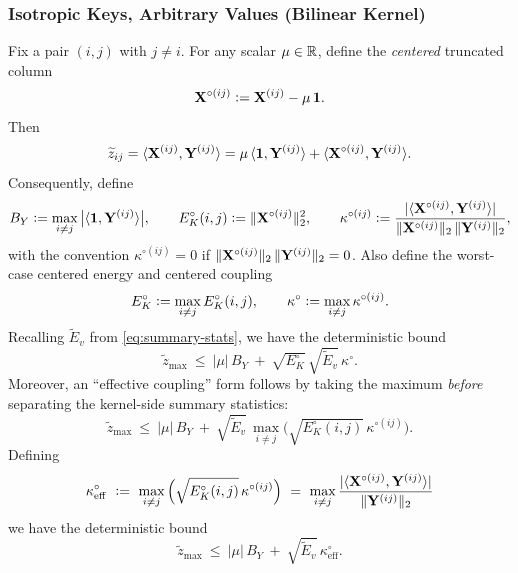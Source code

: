 \subsubsection{Isotropic Keys, Arbitrary Values (Bilinear Kernel)}
\begin{lemma}
\label{lem:mean-residual-app}
Fix a pair $(i,j)$ with $j\neq i$.
For any scalar $\mu\in\mathbb{R}$, define the \emph{centered} truncated column
\[
\mathbf{X}^{\circ(ij)} \vcentcolon= \mathbf{X}^{(ij)}-\mu\,{\mathbf{1}}.
\]
Then
\[
\widetilde{z}_{ij}=\langle {\mathbf{X}^{(ij)}}, {\mathbf{Y}^{(ij)}} \rangle
= \mu\,\langle {{\mathbf{1}}}, {\mathbf{Y}^{(ij)}} \rangle + \langle {\mathbf{X}^{\circ(ij)}}, {\mathbf{Y}^{(ij)}} \rangle.
\]
Consequently, define
\[
B_{Y} \vcentcolon= \max_{i\neq j}\big|\langle {{\mathbf{1}}}, {\mathbf{Y}^{(ij)}} \rangle\big|,
\qquad
E_{K}^\circ(i,j) \vcentcolon= \|\mathbf{X}^{\circ(ij)}\|_{2}^2,
\qquad
\kappa^{\circ(ij)} \vcentcolon= \frac{|\langle {\mathbf{X}^{\circ(ij)}}, {\mathbf{Y}^{(ij)}} \rangle|}{\|\mathbf{X}^{\circ(ij)}\|_{2}\,\|\mathbf{Y}^{(ij)}\|_2},
\]
with the convention $\kappa^{\circ(ij)}=0$ if $\|\mathbf{X}^{\circ(ij)}\|_{2}\,\|\mathbf{Y}^{(ij)}\|_{2}=0$.
Also define the worst-case centered energy and centered coupling
\[
E_{K}^\circ \vcentcolon= \max_{i\neq j}E_{K}^\circ(i,j),
\qquad
\kappa^\circ \vcentcolon= \max_{i\neq j}\kappa^{\circ(ij)}.
\]
Recalling $\widetilde{E}_{v}$ from \eqref{eq:summary-stats}, we have the deterministic bound
\[
\widetilde{z}_{\max}\ \le\ |\mu|\,B_{Y}\ +\ \sqrt{E_{K}^\circ}\,\sqrt{\widetilde{E}_v}\,\kappa^\circ.
\]
Moreover, an ``effective coupling'' form follows by taking the maximum
\emph{before} separating the kernel-side summary statistics:
\[
\widetilde{z}_{\max}
\ \le\
|\mu|\,B_{Y}
\ +\
\sqrt{\widetilde{E}_v}\,\max_{i\neq j}\Big(\sqrt{E_{K}^\circ(i,j)}\,\kappa^{\circ(ij)}\Big).
\]
Defining
\[
\kappa_{\mathrm{eff}}^\circ
\ \vcentcolon=\
\max_{i\neq j}\Big(\sqrt{E_{K}^\circ(i,j)}\,\kappa^{\circ(ij)}\Big)
\ =\
\max_{i\neq j}\frac{|\langle {\mathbf{X}^{\circ(ij)}}, {\mathbf{Y}^{(ij)}} \rangle|}{\|\mathbf{Y}^{(ij)}\|_2}
\]
we have the deterministic bound
\[
\widetilde{z}_{\max}\ \le\ |\mu|\,B_{Y}\ +\ \sqrt{\widetilde{E}_v}\,\kappa_{\mathrm{eff}}^\circ.
\]
\end{lemma}

